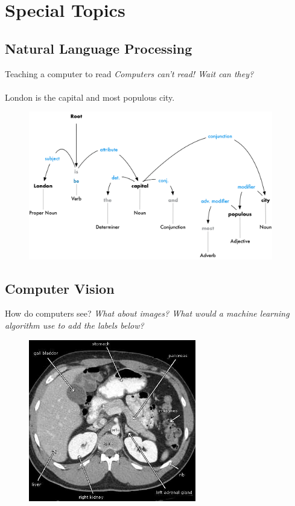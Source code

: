 \documentclass[10pt]{beamer}
\begin{document}
\section{Special Topics}

\subsection{Natural Language Processing}

\begin{frame}{Teaching a computer to read}
\emph{Computers can't read! Wait can they?} \\~\\
London is the capital and most populous city.
	\begin{figure}
		\includegraphics[width=0.95\textwidth, center, trim=0cm 0cm 0 0cm]{images/NLP_tree.png}
	\end{figure}

\end{frame}

\subsection{Computer Vision}

\begin{frame}{How do computers see?}
\emph{What about images? What would a machine learning algorithm use to add the labels below?}	
	\begin{figure}
		\includegraphics[width=0.65\textwidth, center, trim=0cm 0cm 0 0cm]{images/CT_scan.jpeg}
	\end{figure}

\end{frame}
\end{document}
